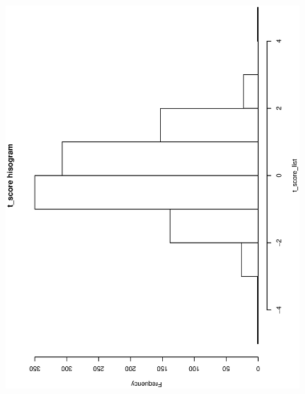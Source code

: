 \documentclass[a4paper,10pt]{article}
\begin{document}
\begin{figure}
\includegraphics[angle=-90, width=1\textwidth]{figures/math650_hw4_t_score_hist.eps}
\caption{}\label{f3}
\end{figure}
\end{document}
